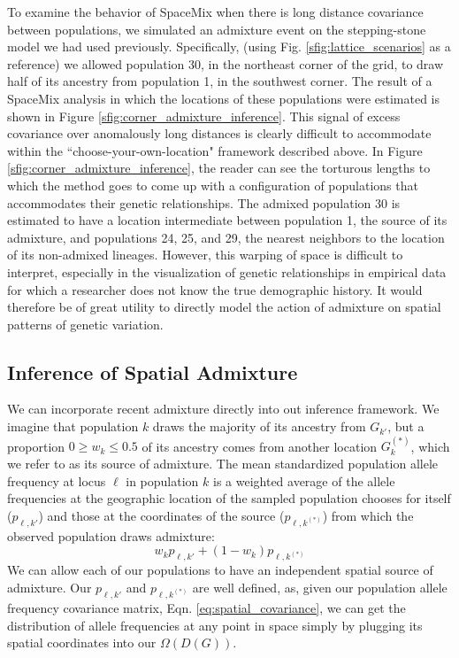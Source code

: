 \documentclass[12pt]{article}
\newcommand{\kadmixsource}[1]{{$G^{(*)}_{#1}$}}
\newcommand{\identifyadmixsource}[1]{{#1^{(*)}}}
\begin{document}
To examine the behavior of SpaceMix when there is long distance covariance between populations, we simulated an admixture event on the stepping-stone model we had used previously.  Specifically, (using Fig. \ref{sfig:lattice_scenarios} as a reference) we allowed population 30, in the northeast corner of the grid, to draw half of its ancestry from population 1, in the southwest corner.  The result of a SpaceMix analysis in which the locations of these populations were estimated is shown in Figure \ref{sfig:corner_admixture_inference}.
This signal of excess covariance over anomalously long distances is clearly difficult to accommodate within the ``choose-your-own-location" framework described above.  In Figure \ref{sfig:corner_admixture_inference}, the reader can see the torturous lengths to which the method goes to come up with a configuration of populations that accommodates their genetic relationships.  The admixed population 30 is estimated to have a location intermediate between population 1, the source of its admixture, and populations 24, 25, and 29, the nearest neighbors to the location of its non-admixed lineages.  However, this warping of space is difficult to interpret, especially in the visualization of genetic relationships in empirical data for which a researcher does not know the true demographic history.  It would therefore be of great utility to directly model the action of admixture on spatial patterns of genetic variation.

\subsection*{Inference of Spatial Admixture}
We can incorporate recent admixture directly into out inference framework.  We imagine that population $k$ draws the majority of its ancestry from $G_{k'}$, but a proportion $0 \geq w_k \leq 0.5$ of its ancestry comes from another location \kadmixsource{k}, which we refer to as its source of admixture. The mean standardized population allele frequency at locus $\ell$ in population $k$ is a weighted average of the allele frequencies at the geographic location of the sampled population chooses for itself ($p_{\ell,k'}$) and those at the coordinates of the source ($p_{\ell,\identifyadmixsource{k}}$) from which the observed population draws admixture:
\begin{equation}
w_k p_{\ell,k'} + (1-w_k) p_{\ell,\identifyadmixsource{k}} \label{eqn-admixedfreq}
\end{equation}
We can allow each of our populations to have an independent spatial source of admixture. Our $p_{\ell,k'}$ and $p_{\ell,\identifyadmixsource{k}} $ are well defined, as, given our population allele frequency covariance matrix, Eqn. \ref{eq:spatial_covariance}, we can get the distribution of allele frequencies at any point in space simply by plugging its spatial coordinates into our $\Omega(D(G))$.
\end{document}
